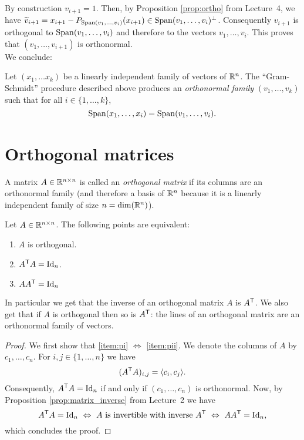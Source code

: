 \documentclass[11pt,nocut]{article}
\begin{document}
By construction $v_{i+1} = 1$. 
Then, by Proposition \ref{prop:ortho} from Lecture~4, we have $\widetilde{v}_{i+1} = x_{i+1} - P_{{{\rm Span}}(v_1, \dots, v_i)}(x_{i+1}) \in {{\rm Span}}(v_1, \dots, v_i)^{\perp}$. Consequently $v_{i+1}$ is orthogonal to ${{\rm Span}}(v_1, \dots, v_i)$ and therefore to the vectors $v_1, \dots, v_i$. This proves that $(v_1, \dots, v_{i+1})$ is orthonormal.
\\

We conclude:

\begin{theorem}\label{th:gram_schmidt}
	Let $(x_1, \dots x_k)$ be a linearly independent family of vectors of $\mathbb{R}^n$. The ``Gram-Schmidt'' procedure described above produces an \emph{orthonormal family} $(v_1, \dots, v_k)$ such that for all $i \in \{1, \dots, k\}$,
	$$
	{{\rm Span}}(x_1, \dots, x_i) = {{\rm Span}}(v_1, \dots, v_i).
	$$
\end{theorem}

\section{Orthogonal matrices}

\begin{definition}
	A matrix $A \in \mathbb{R}^{n \times n}$ is called an \emph{orthogonal matrix} if its columns are an orthonormal family (and therefore a basis of $\mathbb{R}^n$ because it is a linearly independent family of size $n = {{\rm dim}}(\mathbb{R}^n)$).
\end{definition}

\begin{proposition}\label{prop:equiv_orthogonal}
	Let $A \in \mathbb{R}^{n \times n}$. The following points are equivalent:
	\begin{enumerate}[label=(\roman*)]
		\item \label{item:pi} $A$ is orthogonal.
		\item \label{item:pii} $A^{{\sf T}} A = {{\rm Id}}_n$.
		\item \label{item:piii} $A A^{{\sf T}} = {{\rm Id}}_n$
	\end{enumerate}
\end{proposition}
In particular we get that the inverse of an orthogonal matrix $A$ is $A^{{\sf T}}$. We also get that if $A$ is orthogonal then so is $A^{{\sf T}}$: the lines of an orthogonal matrix are an orthonormal family of vectors.
\\

\begin{proof}
	We first show that \ref{item:pi} $\Leftrightarrow$ \ref{item:pii}. We denote the columns of $A$ by $c_1, \dots, c_n$. For $i,j \in \{1 ,\dots, n \}$ we have
	$$
	(A^{{\sf T}}A)_{i,j} = \langle c_i, c_j \rangle.
	$$
	Consequently, $A^{{\sf T}} A = {{\rm Id}}_n$ if and only if $(c_1, \dots, c_n)$ is orthonormal. 
	Now, by Proposition \ref{prop:matrix_inverse} from Lecture~2 we have
	$$
		A^{{\sf T}} A = {{\rm Id}}_n
		\ \Leftrightarrow \
		A \ \text{is invertible with inverse} \ A^{{\sf T}}
		\ \Leftrightarrow \
		A A^{{\sf T}} = {{\rm Id}}_n,
	$$
	which concludes the proof.
\end{proof}
\end{document}
